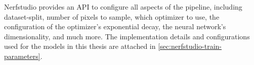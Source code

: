 Nerfstudio provides an API to configure all aspects of the pipeline, including dataset-split, number of pixels to sample, which optimizer to use, the configuration of the optimizer's exponential decay, the neural network's dimensionality, and much more. The implementation details and configurations used for the models in this thesis are attached in \autoref{sec:nerfstudio-train-parameters}.



\begin{comment}
The experiments in this thesis focus on the faster NeRF models implemented in Nerfstudio, namely Nerfacto (\autoref{sec:nerfacto}) and Instant NGP (\autoref{sec:instant-ngp}). Although the models are different, most of the shared model configurations are the same as can be seen in the model parameters included in \autoref{sec:nerfstudio-train-parameters}.

During training, the parameters in the model are trained to represent the 3D scene. For the Nerfacto-model, this entails backpropagating the error and updating both the NeRF MLP and the proposal MLP. The Nerfacto- and Instant NGP-model leverage 3 different losses to guide the training; \textit{RGB loss}, \textit{interlevel loss} and \textit{distortion loss}. \textit{RGB loss} is the standard NeRF-loss explained in \autoref{eq:nerf-loss}. Interlevel- and distortion-loss are both from the Mip-NeRF 360 implementation explained in \autoref{sec:mipnerf360}. The interlevel loss encourages the model to generate consistent predictions across different levels of the multi-scale hierarchy, while the distortion loss encourages the model to generate smooth and continuous predictions.

The training leverages the ADAM optimizer \cite{adam} for all networks within the model. The optimizer for the proposal networks and Nerfacto fields both use a learning rate of $1 \times 10^{-2}$, with no weight decay and $\epsilon=10^{-8}$, while the camera optimizer uses a learning rate of $6 \times 10^{-4}$, weight decay of $1 \times 10^{-2}$, and $\epsilon=10^{-8}$. All scenes were trained for 15,000 iterations, which is sufficient for achieving convergence. Training time for each scene is approximately 15-20 minutes when using an NVIDIA A100 GPU.


\end{comment}

